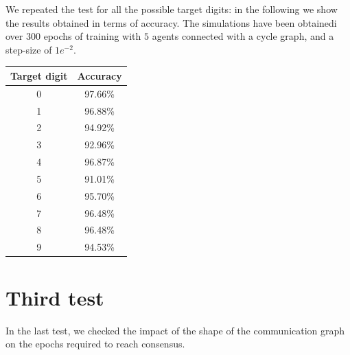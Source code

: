 \documentclass[a4paper,11pt,oneside]{book}
\begin{document}
We repeated the test for all the possible target digits: in the following we show the results obtained in terms of accuracy.
The simulations have been obtainedi over 300 epochs of training with $5$ agents connected with a cycle graph, and a step-size of $1e^{-2}$.

\begin{center}
\begin{tabular}{|c|c|}
\hline
Target digit & Accuracy \\
\hline
0 & 97.66\% \\
1 & 96.88\% \\
2 & 94.92\% \\
3 & 92.96\% \\
4 & 96.87\% \\
5 & 91.01\% \\
6 & 95.70\% \\
7 & 96.48\%\\
8 & 96.48\% \\
9 & 94.53\% \\
\hline
\end{tabular}
\end{center}

\section{Third test}
In the last test, we checked the impact of the shape of the communication graph on the epochs required to reach consensus.
\end{document}
